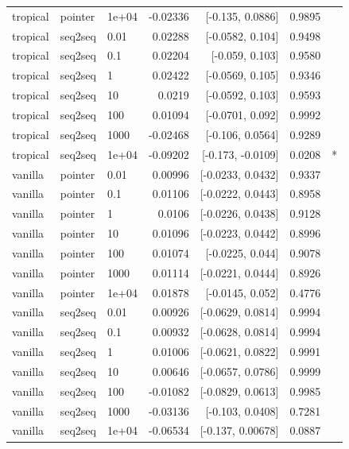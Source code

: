 \documentclass[10pt]{article}
\begin{document}
{\begin{longtable}{lllrrrl}
tropical & pointer & 1e+04 & -0.02336 & [-0.135, 0.0886] & 0.9895 & \\
tropical & seq2seq & 0.01 & 0.02288 & [-0.0582, 0.104] & 0.9498 & \\
tropical & seq2seq & 0.1 & 0.02204 & [-0.059, 0.103] & 0.9580 & \\
tropical & seq2seq & 1 & 0.02422 & [-0.0569, 0.105] & 0.9346 & \\
tropical & seq2seq & 10 & 0.0219 & [-0.0592, 0.103] & 0.9593 & \\
tropical & seq2seq & 100 & 0.01094 & [-0.0701, 0.092] & 0.9992 & \\
tropical & seq2seq & 1000 & -0.02468 & [-0.106, 0.0564] & 0.9289 & \\
tropical & seq2seq & 1e+04 & -0.09202 & [-0.173, -0.0109] & 0.0208 & *\\
vanilla & pointer & 0.01 & 0.00996 & [-0.0233, 0.0432] & 0.9337 & \\
vanilla & pointer & 0.1 & 0.01106 & [-0.0222, 0.0443] & 0.8958 & \\
vanilla & pointer & 1 & 0.0106 & [-0.0226, 0.0438] & 0.9128 & \\
vanilla & pointer & 10 & 0.01096 & [-0.0223, 0.0442] & 0.8996 & \\
vanilla & pointer & 100 & 0.01074 & [-0.0225, 0.044] & 0.9078 & \\
vanilla & pointer & 1000 & 0.01114 & [-0.0221, 0.0444] & 0.8926 & \\
vanilla & pointer & 1e+04 & 0.01878 & [-0.0145, 0.052] & 0.4776 & \\
vanilla & seq2seq & 0.01 & 0.00926 & [-0.0629, 0.0814] & 0.9994 & \\
vanilla & seq2seq & 0.1 & 0.00932 & [-0.0628, 0.0814] & 0.9994 & \\
vanilla & seq2seq & 1 & 0.01006 & [-0.0621, 0.0822] & 0.9991 & \\
vanilla & seq2seq & 10 & 0.00646 & [-0.0657, 0.0786] & 0.9999 & \\
vanilla & seq2seq & 100 & -0.01082 & [-0.0829, 0.0613] & 0.9985 & \\
vanilla & seq2seq & 1000 & -0.03136 & [-0.103, 0.0408] & 0.7281 & \\
vanilla & seq2seq & 1e+04 & -0.06534 & [-0.137, 0.00678] & 0.0887 & \\
\bottomrule
\end{longtable}
}
\end{document}
